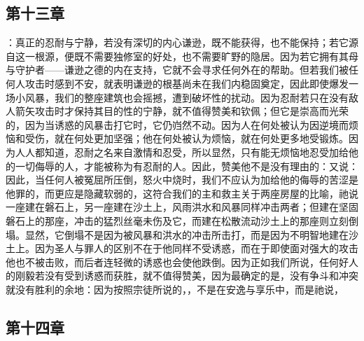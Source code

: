 
\subsection{第十三章}

\par

：真正的忍耐与宁静，若没有深切的内心谦逊，既不能获得，也不能保持；若它源自这一根源，便既不需要独修室的好处，也不需要旷野的隐居。因为若它拥有其母与守护者——谦逊之德的内在支持，它就不会寻求任何外在的帮助。但若我们被任何人攻击时感到不安，就表明谦逊的根基尚未在我们内稳固奠定，因此即使爆发一场小风暴，我们的整座建筑也会摇撼，遭到破坏性的扰动。因为忍耐若只在没有敌人箭矢攻击时才保持其目的性的宁静，就不值得赞美和钦佩；但它是崇高而光荣的，因为当诱惑的风暴击打它时，它仍岿然不动。因为人在何处被认为因逆境而烦恼和受伤，就在何处更加坚强；他在何处被认为烦恼，就在何处更多地受锻炼。因为人人都知道，忍耐之名来自激情和忍受，所以显然，只有能无烦恼地忍受加给他的一切侮辱的人，才能被称为有忍耐的人。因此，赞美他不是没有理由的：又说：因此，当任何人被冤屈所压倒，怒火中烧时，我们不应认为加给他的侮辱的苦涩是他罪的，而更应是隐藏软弱的，这符合我们的主和救主关于两座房屋的比喻，祂说一座建在磐石上，另一座建在沙土上，风雨洪水和风暴同样冲击两者；但建在坚固磐石上的那座，冲击的猛烈丝毫未伤及它，而建在松散流动沙土上的那座则立刻倒塌。显然，它倒塌不是因为被风暴和洪水的冲击所击打，而是因为不明智地建在沙土上。因为圣人与罪人的区别不在于他同样不受诱惑，而在于即使面对强大的攻击他也不被击败，而后者连轻微的诱惑也会使他跌倒。因为正如我们所说，任何好人的刚毅若没有受到诱惑而获胜，就不值得赞美，因为最确定的是，没有争斗和冲突就没有胜利的余地：因为按照宗徒所说的，，不是在安逸与享乐中，而是祂说，\par


\subsection{第十四章}


